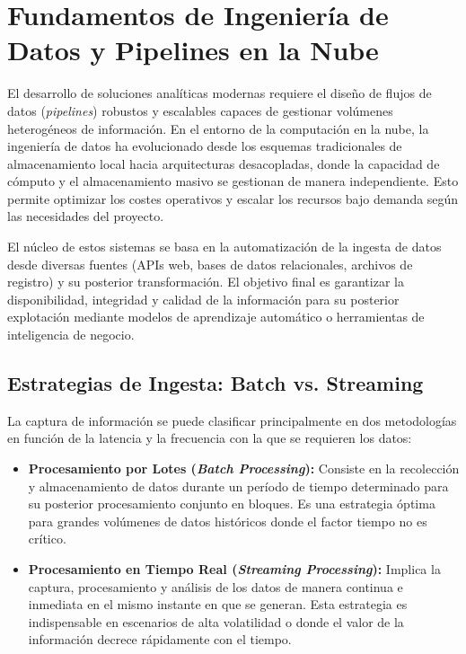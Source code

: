 \documentclass[12pt,oneside,a4paper]{report}
\renewcommand{\_}{\textunderscore\allowbreak}
\begin{document}
\section{Fundamentos de Ingeniería de Datos y Pipelines en la Nube}

El desarrollo de soluciones analíticas modernas requiere el diseño de flujos de datos (\textit{pipelines}) robustos y escalables capaces de gestionar volúmenes heterogéneos de información. En el entorno de la computación en la nube, la ingeniería de datos ha evolucionado desde los esquemas tradicionales de almacenamiento local hacia arquitecturas desacopladas, donde la capacidad de cómputo y el almacenamiento masivo se gestionan de manera independiente. Esto permite optimizar los costes operativos y escalar los recursos bajo demanda según las necesidades del proyecto.

El núcleo de estos sistemas se basa en la automatización de la ingesta de datos desde diversas fuentes (APIs web, bases de datos relacionales, archivos de registro) y su posterior transformación. El objetivo final es garantizar la disponibilidad, integridad y calidad de la información para su posterior explotación mediante modelos de aprendizaje automático o herramientas de inteligencia de negocio.

\subsection{Estrategias de Ingesta: Batch vs. Streaming}

La captura de información se puede clasificar principalmente en dos metodologías en función de la latencia y la frecuencia con la que se requieren los datos:

\begin{itemize}
    \item \textbf{Procesamiento por Lotes (\textit{Batch Processing}):} Consiste en la recolección y almacenamiento de datos durante un período de tiempo determinado para su posterior procesamiento conjunto en bloques. Es una estrategia óptima para grandes volúmenes de datos históricos donde el factor tiempo no es crítico.
    \item \textbf{Procesamiento en Tiempo Real (\textit{Streaming Processing}):} Implica la captura, procesamiento y análisis de los datos de manera continua e inmediata en el mismo instante en que se generan. Esta estrategia es indispensable en escenarios de alta volatilidad o donde el valor de la información decrece rápidamente con el tiempo.
\end{itemize}
\end{document}

